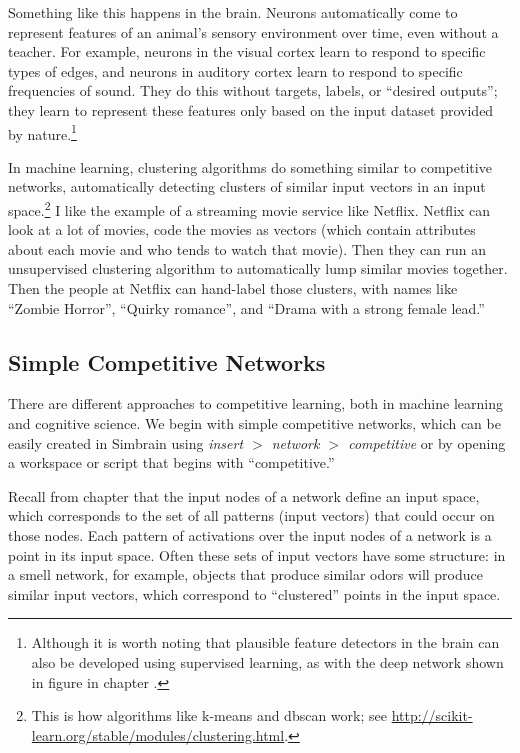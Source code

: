 Something like this happens in the brain. Neurons automatically come to represent features of an animal's sensory environment over time, even without a teacher. For example, neurons in the visual cortex learn to respond to specific types of edges, and neurons in auditory cortex learn to respond to specific frequencies of sound. They do this without targets, labels, or ``desired outputs''; they learn to represent these features only based on the input dataset provided by nature.\footnote{Although it is worth noting that plausible feature detectors in the brain can also be developed using supervised learning, as with the deep network shown in figure   in chapter .}

In machine learning, clustering algorithms do something similar to competitive networks, automatically detecting clusters of similar input vectors in an input space.\footnote{This is how algorithms like k-means and dbscan work; see \url{http://scikit-learn.org/stable/modules/clustering.html}.} I like the example of a streaming movie service like Netflix. Netflix can look at  a lot of movies, code the movies as vectors (which contain attributes about each movie and who tends to watch that movie). Then they can run an unsupervised clustering algorithm to automatically lump similar movies together. Then the people at Netflix can hand-label those clusters, with names like ``Zombie Horror'', ``Quirky romance'', and ``Drama with a strong female lead.''

\subsection{Simple Competitive Networks}

There are different approaches to competitive learning, both in machine learning and cognitive science. We begin with simple competitive networks, which can be easily created in Simbrain using \emph{insert $>$ network $>$ competitive} or by opening a workspace or script that begins with ``competitive.''

Recall from chapter  that the input nodes of a network define an input space, which corresponds to the set of all patterns (input vectors) that could occur on those nodes. Each pattern of activations over the input nodes of a network is a point in its input space. Often these sets of input vectors have some structure: in a smell network, for example, objects that produce similar odors will produce similar input vectors, which correspond to ``clustered'' points in the input space. 

